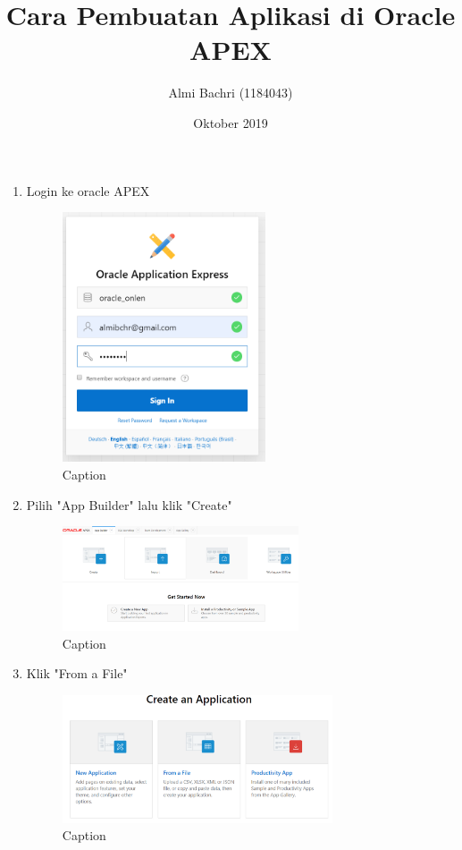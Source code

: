 \documentclass{article}
\title{Cara Pembuatan Aplikasi di Oracle APEX}
\author{Almi Bachri (1184043) }
\date{Oktober 2019}
\begin{document}
\maketitle
\begin{enumerate}
    \item Login ke oracle APEX
    \begin{figure}[!htbp]
        \centering
        \includegraphics [width=6cm]{figure/Capture.PNG}
        \caption{Caption}
        \label{fig:my_label}
    \end{figure}
    
    \item Pilih "App Builder" lalu klik "Create"
     \begin{figure}[!htbp]
        \centering
        \includegraphics [width=7cm]{figure/Capture1.PNG}
        \caption{Caption}
        \label{fig:my_label}
    \end{figure}
    
    \item Klik "From a File"
     \begin{figure}[!htbp]
        \centering
        \includegraphics [width=8cm]{figure/Capture2.PNG}
        \caption{Caption}
        \label{fig:my_label}
    \end{figure}
    

\end{enumerate}
\end{document}
